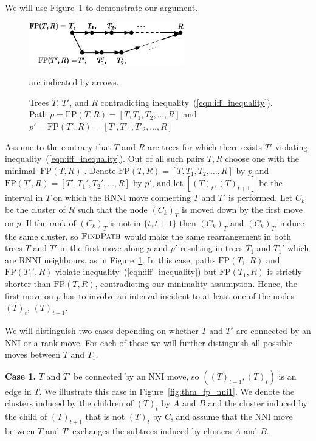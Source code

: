 \documentclass{amsart}
\newcommand{\rnni}{\mathrm{RNNI}}
\newcommand{\findpath}{\textsc{FindPath}}
\newcommand{\nni}{\mathrm{NNI}}
\newcommand{\fp}{\mathrm{FP}}
\begin{document}
We will use Figure~\ref{fig:proof_idea} to demonstrate our argument.

\begin{figure}[!hbt]
\centering
\includegraphics[width=0.6\textwidth]{proof_idea_ag}
\vspace{12pt}
\caption{Trees $T$, $T'$, and $R$ contradicting inequality~(\ref{eqn:iff_inequality}).
Path $p = \fp(T,R) = [T,T_1,T_2, \ldots, R]$ and $p' = \fp(T',R) = [T',T'_1,T'_2, \ldots, R]$} are indicated by arrows.
\label{fig:proof_idea}
\end{figure}

Assume to the contrary that $T$ and $R$ are trees for which there exists $T'$ violating inequality~(\ref{eqn:iff_inequality}).
Out of all such pairs $T, R$ choose one with the minimal $|\fp(T, R)|$.
Denote $\fp(T,R) = [T, T_1, T_2, \ldots, R]$ by $p$ and $\fp(T', R) = [T', T_1', T_2', \ldots, R]$ by $p'$, and let $[(T)_t, (T)_{t+1}]$ be the interval in $T$ on which the $\rnni$ move connecting $T$ and $T'$ is performed.
Let $C_k$ be the cluster of $R$ such that the node $(C_k)_T$ is moved down by the first move on $p$.
If the rank of $(C_k)_T$ is not in $\{t, t+1\}$ then $(C_k)_T$ and $(C_k)_{T'}$ induce the same cluster, so $\findpath$ would make the same rearrangement in both trees $T$ and $T'$ in the first move along $p$ and $p'$ resulting in trees $T_1$ and $T_1'$ which are $\rnni$ neighbours, as in Figure~\ref{fig:proof_idea}.
In this case, paths $\fp(T_1, R)$ and $\fp(T_1', R)$ violate inequality~(\ref{eqn:iff_inequality}) but $\fp(T_1, R)$ is strictly shorter than $\fp(T, R)$, contradicting our minimality assumption.
Hence, the first move on $p$ has to involve an interval incident to at least one of the nodes $(T)_t$, $(T)_{t+1}$.

We will distinguish two cases depending on whether $T$ and $T'$ are connected by an $\nni$ or a rank move.
For each of these we will further distinguish all possible moves between $T$ and $T_1$.

\textbf{Case 1.} $T$ and $T'$ be connected by an $\nni$ move, so $((T)_{t+1},(T)_t)$ is an edge in $T$.
We illustrate this case in Figure~\ref{fig:thm_fp_nni1}.
We denote the clusters induced by the children of $(T)_t$ by $A$ and $B$ and the cluster induced by the child of $(T)_{t+1}$ that is not $(T)_t$ by $C$, and assume that the $\nni$ move between $T$ and $T'$ exchanges the subtrees induced by clusters $A$ and $B$.
\end{document}
